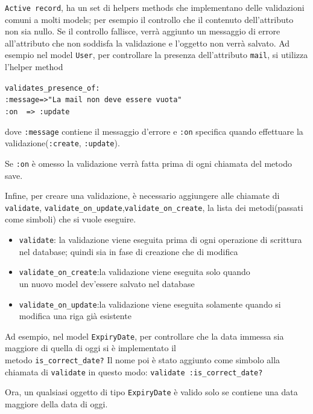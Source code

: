 \documentclass[11pt,a4paper]{article}
\begin{document}
\verb|Active record|, ha un set di helpers methods che implementano delle validazioni comuni a molti models; per esempio il controllo che il contenuto dell'attributo non sia nullo.
Se il controllo fallisce, verrà aggiunto un messaggio di errore all'attributo che non soddisfa la validazione e l'oggetto non verrà salvato.
Ad esempio nel model \verb|User|, per controllare la presenza dell'attributo \verb|mail|, si utilizza l'helper method 
\begin{center}
 \verb|validates_presence_of:|\\
 \verb|:message=>"La mail non deve essere vuota"|\\
 \verb|:on  => :update|\\
\end{center}
dove \verb|:message| contiene il messaggio d'errore e \verb|:on| specifica quando effettuare la validazione(\verb|:create|, \verb|:update|).

 
Se \verb|:on| è omesso la validazione verrà fatta prima di ogni chiamata del metodo save.


Infine, per creare una validazione, è necessario aggiungere alle chiamate di \verb|validate|, \verb|validate_on_update|,\verb|validate_on_create|, la lista dei metodi(passati come simboli) che si vuole eseguire.
\begin{itemize}
 \item \verb|validate|: la validazione viene eseguita prima di ogni operazione di scrittura nel database; quindi sia in fase di creazione che di modifica
 \item \verb|validate_on_create|:la validazione viene eseguita solo quando\\ un nuovo model dev'essere salvato nel database
 \item \verb|validate_on_update|:la validazione viene eseguita solamente quando si modifica una riga già esistente
\end{itemize}


Ad esempio, nel model \verb|ExpiryDate|, per controllare che la data immessa sia maggiore di quella di oggi si è implementato il \\metodo \verb|is_correct_date?|
Il nome poi è stato aggiunto come simbolo alla chiamata di \verb|validate| in questo modo: \verb|validate :is_correct_date?|


Ora, un qualsiasi oggetto di tipo \verb|ExpiryDate| è valido solo se contiene una data maggiore della data di oggi.
\end{document}
